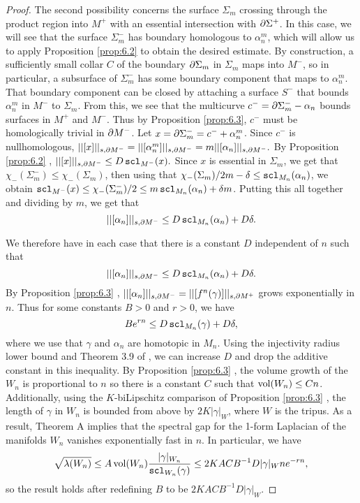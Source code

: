 \begin{proof}
The second possibility concerns the surface $\Sigma_m$ crossing through the product region into $M^+$ with an essential intersection with $\partial \Sigma^+$. In this case, we will see that the surface $\Sigma_m^-$ has boundary homologous to $\alpha_n^m$, which will allow us to apply Proposition \ref{prop:6.2} to obtain the desired estimate. By construction, a sufficiently small collar $C$ of the boundary $\partial \Sigma_m$ in $\Sigma_m$ maps into $M^-$, so in particular, a subsurface of $\Sigma_m^-$ has some boundary component that maps to $\alpha_n^m$. That boundary component can be closed by attaching a surface $S^-$ that bounds $\alpha_n^m$ in $M^-$ to $\Sigma_m$.
From this, we see that the multicurve $c^- = \partial \Sigma^-_m -\alpha_n $ bounds surfaces in $M^+$ and $M^-$.
Thus by Proposition \ref{prop:6.3}, $c^-$ must be homologically trivial in $\partial M^{-}$. Let $x = \partial\Sigma_m^- = c^- + \alpha_n^m$. Since $c^-$ is nullhomologous, $||[x]||_{s,\partial M^-} = ||[\alpha_n^m]||_{s,\partial M^-} = m||[\alpha_n]||_{s,\partial M^-}.$
By Proposition \ref{prop:6.2} , $||[x]||_{s,\partial M^-}\leq D\operatorname{{\tt{scl}}}_{M^-}(x).$ Since $x$ is essential in $\Sigma_m$, we get that $\chi_-(\Sigma_m^-) \leq \chi_-(\Sigma_m)$, then using that $\chi_-(\Sigma_m)/2m - \delta \leq \operatorname{{\tt{scl}}}_{M_n}(\alpha_n)$,
we obtain $\operatorname{{\tt{scl}}}_{M^-}(x) \leq \chi_-(\Sigma_m^-)/2 \leq m\operatorname{{\tt{scl}}}_{M_n}(\alpha_n) + \delta m$.
Putting this all together and dividing by $m$, we get that $$||[\alpha_n]||_{s,\partial M^-}\leq D\operatorname{{\tt{scl}}}_{M_n}(\alpha_n) + D\delta.$$

We therefore have in each case that there is a constant $D$ independent of $n$ such that $$||[\alpha_n]||_{s,\partial M^-}\leq D\operatorname{{\tt{scl}}}_{M_n}(\alpha_n) + D\delta.$$ By Proposition \ref{prop:6.3} , $||[\alpha_n]||_{s,\partial M^-} = ||[f^n(\gamma)]||_{s,\partial M^+}$ grows exponentially in $n$.
Thus for some constants $B>0$ and $r >0$, we have $$Be^{rn}\leq D\operatorname{{\tt{scl}}}_{M_n}(\gamma) + D\delta,$$ where we use that $\gamma$ and $\alpha_n$ are homotopic in $M_n$. Using the injectivity radius lower bound and Theorem 3.9 of \cite{Calegari}, we can increase $D$ and drop the additive constant in this inequality. By Proposition \ref{prop:6.3} , the volume growth of the $W_n$ is proportional to $n$ so there is a constant $C$ such that $\operatorname{vol}(W_n)\leq Cn$.
Additionally, using the $K$-biLipschitz comparison of Proposition \ref{prop:6.3} , the length of $\gamma$ in $W_n$ is bounded from above by $2K|\gamma|_{W}$, where $W$ is the tripus. As a result, Theorem A implies that the spectral gap for the 1-form Laplacian of the manifolds $W_n$ vanishes exponentially fast in $n$.
In particular, we have \[\sqrt{\lambda(W_n)} \leq A\operatorname{vol}(W_n)\frac{|\gamma|_{W_n}}{\operatorname{{\tt{scl}}}_{W_n}(\gamma)} \leq 2KACB^{-1}D|\gamma|_Wne^{-rn},\] so the result holds after redefining $B$ to be $2KACB^{-1}D|\gamma|_W.$

\end{proof}
